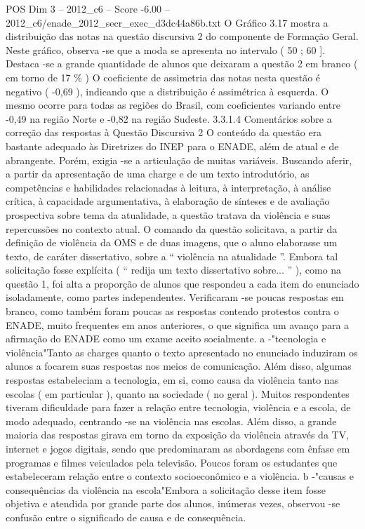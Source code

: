 \begin{textsample}{POS Dim 3 – 2012\_c6 – Score -6.00 – 2012\_c6/enade\_2012\_secr\_exec\_d3dc44a86b.txt}
O Gráfico 3.17 mostra a distribuição das notas na questão discursiva 2 do componente de Formação Geral.
Neste gráfico, observa -se que a moda se apresenta no intervalo ( 50 ; 60 ].
Destaca -se a grande quantidade de alunos que deixaram a questão 2 em branco ( em torno de 17 \% ) O coeficiente de assimetria das notas nesta questão é negativo ( -0,69 ), indicando que a distribuição é assimétrica à esquerda.
O mesmo ocorre para todas as regiões do Brasil, com coeficientes variando entre -0,49 na região Norte e -0,82 na região Sudeste. 3.3.1.4 Comentários sobre a correção das respostas à Questão Discursiva 2 O conteúdo da questão era bastante adequado às Diretrizes do INEP para o ENADE, além de atual e de abrangente.
Porém, exigia -se a articulação de muitas variáveis.
Buscando aferir, a partir da apresentação de uma charge e de um texto introdutório, as competências e habilidades relacionadas à leitura, à interpretação, à análise crítica, à capacidade argumentativa, à elaboração de sínteses e de avaliação prospectiva sobre tema da atualidade, a questão tratava da violência e suas repercussões no contexto atual.
O comando da questão solicitava, a partir da definição de violência da OMS e de duas imagens, que o aluno elaborasse um texto, de caráter dissertativo, sobre a “ violência na atualidade ”.
Embora tal solicitação fosse explícita ( “ redija um texto dissertativo sobre... ” ), como na questão 1, foi alta a proporção de alunos que respondeu a cada item do enunciado isoladamente, como partes independentes.
Verificaram -se poucas respostas em branco, como também foram poucas as respostas contendo protestos contra o ENADE, muito frequentes em anos anteriores, o que significa um avanço para a afirmação do ENADE como um exame aceito socialmente. a -"tecnologia e violência"Tanto as charges quanto o texto apresentado no enunciado induziram os alunos a focarem suas respostas nos meios de comunicação.
Além disso, algumas respostas estabeleciam a tecnologia, em si, como causa da violência tanto nas escolas ( em particular ), quanto na sociedade ( no geral ).
Muitos respondentes tiveram dificuldade para fazer a relação entre tecnologia, violência e a escola, de modo adequado, centrando -se na violência nas escolas.
Além disso, a grande maioria das respostas girava em torno da exposição da violência através da TV, internet e jogos digitais, sendo que predominaram as abordagens com ênfase em programas e filmes veiculados pela televisão.
Poucos foram os estudantes que estabeleceram relação entre o contexto socioeconômico e a violência. b -"causas e consequências da violência na escola"Embora a solicitação desse item fosse objetiva e atendida por grande parte dos alunos, inúmeras vezes, observou -se confusão entre o significado de causa e de consequência.

\end{textsample}
